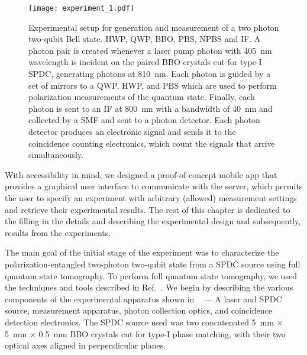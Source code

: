\clearpage

\begin{figure*}[t!]
  \centering
  \texttt{[image: experiment\_1.pdf]}%
  \caption[Experimental setup for generation and measurement of a two-photon two-qubit polarization-entangled Bell state.]{Experimental setup for generation and measurement of a two photon two-qubit Bell state. \gls{HWP}, \gls{QWP}, \gls{BBO}, \gls{PBS}, \gls{NPBS} and \gls{IF}. A photon pair is created whenever a laser pump photon with \SI{405}{nm} wavelength is incident on the paired \acs{BBO} crystals cut for type-I \acs{SPDC}, generating photons at \SI{810}{nm}. Each photon is guided by a set of mirrors to a \acs{QWP}, \acs{HWP}, and \acs{PBS} which are used to perform polarization measurements of the quantum state. Finally, each photon is sent to an \acs{IF} at \SI{800}{nm} with a bandwidth of \SI{40}{nm} and collected by a \gls{SMF} and sent to a photon detector. Each photon detector produces an electronic signal and sends it to the coincidence counting electronics, which count the signals that arrive simultaneously.}
\end{figure*}

\noindent
With accessibility in mind, we designed a proof-of-concept mobile app that provides a graphical user interface to communicate with the server, which permits the user to specify an experiment with arbitrary (allowed) measurement settings and retrieve their experimental results. The rest of this chapter is dedicated to the filling in the details and describing the experimental design and subsequently, results from the experiments.

\bigskip
\noindent
The main goal of the initial stage of the experiment was to characterize the polarization-entangled two-photon two-qubit state from a \acs{SPDC} source using full quantum state tomography. To perform full quantum state tomography, we used the techniques and tools described in Ref.~\cite{James_2001}. We begin by describing the various components of the experimental apparatus shown in ~ --- A laser and \acs{SPDC} source, measurement apparatus, photon collection optics, and coincidence detection electronics. The \acs{SPDC} source used was two concatenated \SI{5}{\milli\meter} $\times$ \SI{5}{\milli\meter} $\times$ \SI{0.5}{\milli\meter} \gls{BBO} crystals cut for type-I phase matching, with their two optical axes aligned in perpendicular planes. 

